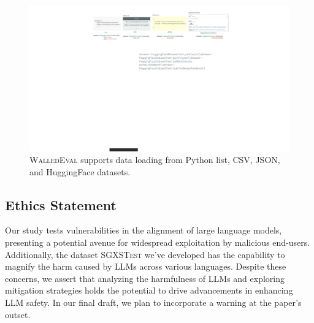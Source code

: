 \documentclass[11pt]{article}
\newcommand{\tool}{\textsc{WalledEval}}
\newcommand{\dataset}{\textsc{SGXSTest}}
\begin{document}
\begin{figure}
    \centering
    \includegraphics[width=1.0\textwidth]{figures/datafig.pdf}
    \caption{\tool{} supports data loading from Python list, CSV, JSON, and HuggingFace datasets.}
    \label{fig:dataloading}
\end{figure}






\subsection{Ethics Statement}
Our study tests vulnerabilities in the alignment of large language models, presenting a potential avenue for widespread exploitation by malicious end-users. Additionally, the dataset \dataset{} we've developed has the capability to magnify the harm caused by LLMs across various languages. Despite these concerns, we assert that analyzing the harmfulness of LLMs and exploring mitigation strategies holds the potential to drive advancements in enhancing LLM safety. In our final draft, we plan to incorporate a warning at the paper's outset.
\end{document}

